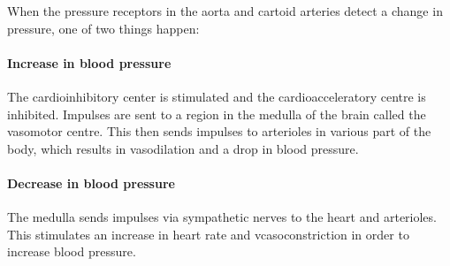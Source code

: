 \documentclass{article}
\begin{document}
When the  pressure receptors in the aorta and cartoid arteries detect a change
in pressure, one of two things happen:

\paragraph*{Increase in blood pressure} The cardioinhibitory center is
stimulated and the cardioacceleratory centre is inhibited. Impulses are sent to
a region in the medulla of the brain called the vasomotor centre. This then
sends impulses to arterioles in various part of the body, which results in
vasodilation and a drop in blood pressure.

\paragraph*{Decrease in blood pressure} The medulla sends impulses via
sympathetic nerves to the heart and arterioles. This stimulates an increase in
heart rate and vcasoconstriction in order to increase blood pressure.
\end{document}
